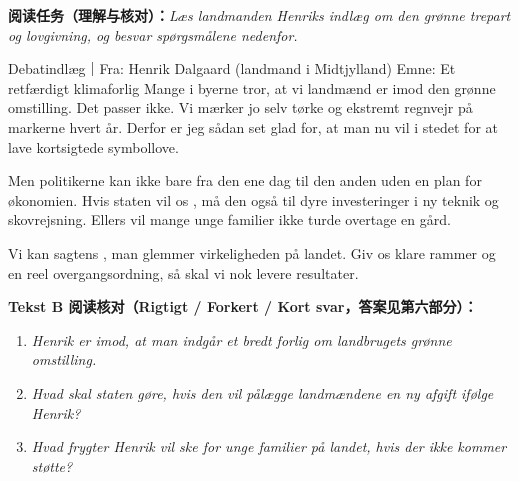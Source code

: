 \textbf{阅读任务（理解与核对）：}\textit{Læs landmanden Henriks indlæg om den grønne trepart og lovgivning, og besvar spørgsmålene nedenfor.}

\begin{emailbox}{Debatindlæg｜Fra: Henrik Dalgaard (landmand i Midtjylland) \quad Emne: Et retfærdigt klimaforlig}
Mange i byerne tror, at vi landmænd er imod den grønne omstilling. Det passer ikke. Vi mærker jo selv tørke og ekstremt regnvejr på markerne hvert år. Derfor er jeg sådan set glad for, at man nu vil  i stedet for at lave kortsigtede symbollove.

Men politikerne kan ikke bare  fra den ene dag til den anden uden en plan for økonomien. Hvis staten vil  os , må den også  til dyre investeringer i ny teknik og skovrejsning. Ellers vil mange unge familier ikke turde overtage en gård.

Vi kan sagtens ,  man glemmer virkeligheden på landet. Giv os klare rammer og en reel overgangsordning, så skal vi nok levere resultater.
\end{emailbox}

\textbf{Tekst B 阅读核对（Rigtigt / Forkert / Kort svar，答案见第六部分）：}
\begin{enumerate}
  \item \textit{Henrik er imod, at man indgår et bredt forlig om landbrugets grønne omstilling.} \underline{\hspace{2.2cm}}
  \item \textit{Hvad skal staten gøre, hvis den vil pålægge landmændene en ny afgift ifølge Henrik?} \underline{\hspace{2.2cm}}
  \item \textit{Hvad frygter Henrik vil ske for unge familier på landet, hvis der ikke kommer støtte?} \underline{\hspace{2.2cm}}
\end{enumerate}

